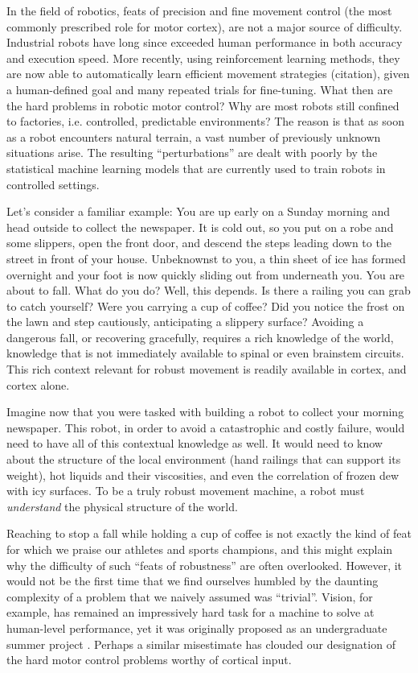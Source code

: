 In the field of robotics, feats of precision and fine movement control (the most commonly prescribed role for motor cortex), are not a major source of difficulty. Industrial robots have long since exceeded human performance in both accuracy and execution speed. More recently, using reinforcement learning methods, they are now able to automatically learn efficient movement strategies (citation), given a human-defined goal and many repeated trials for fine-tuning. What then are the hard problems in robotic motor control? Why are most robots still confined to factories, i.e. controlled, predictable environments? The reason is that as soon as a robot encounters natural terrain, a vast number of previously unknown situations arise. The resulting ``perturbations'' are dealt with poorly by the statistical machine learning models that are currently used to train robots in controlled settings.

Let’s consider a familiar example: You are up early on a Sunday morning and head outside to collect the newspaper. It is cold out, so you put on a robe and some slippers, open the front door, and descend the steps leading down to the street in front of your house. Unbeknownst to you, a thin sheet of ice has formed overnight and your foot is now quickly sliding out from underneath you. You are about to fall. What do you do? Well, this depends. Is there a railing you can grab to catch yourself? Were you carrying a cup of coffee? Did you notice the frost on the lawn and step cautiously, anticipating a slippery surface? Avoiding a dangerous fall, or recovering gracefully, requires a rich knowledge of the world, knowledge that is not immediately available to spinal or even brainstem circuits. This rich context relevant for robust movement is readily available in cortex, and cortex alone.

Imagine now that you were tasked with building a robot to collect your morning newspaper. This robot, in order to avoid a catastrophic and costly failure, would need to have all of this contextual knowledge as well. It would need to know about the structure of the local environment (hand railings that can support its weight), hot liquids and their viscosities, and even the correlation of frozen dew with icy surfaces. To be a truly robust movement machine, a robot must \emph{understand} the physical structure of the world.

Reaching to stop a fall while holding a cup of coffee is not exactly the kind of feat for which we praise our athletes and sports champions, and this might explain why the difficulty of such ``feats of robustness'' are often overlooked. However, it would not be the first time that we find ourselves humbled by the daunting complexity of a problem that we naively assumed was ``trivial''. Vision, for example, has remained an impressively hard task for a machine to solve at human-level performance, yet it was originally proposed as an undergraduate summer project \cite{Papert1966}. Perhaps a similar misestimate has clouded our designation of the hard motor control problems worthy of cortical input. 

